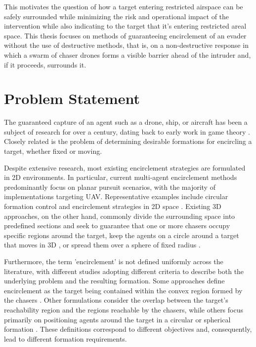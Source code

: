 This motivates the question of how a target entering restricted airspace can be safely surrounded while minimizing the risk and operational impact of the intervention while  also indicating to the target that it's entering restricted areal space. This thesis focuses on methods of guaranteeing encirclement of an evader without the use of destructive methods, that is, on a non-destructive response in which a swarm of chaser drones forms a visible barrier ahead of the intruder and, if it proceeds, surrounds it.

\section{Problem Statement} \label{sec.1:Problem Statement}

The guaranteed capture of an agent such as a drone, ship, or aircraft has been a subject of research for over a century, dating back to early work in game theory \cite{game_theory_1925}. Closely related is the problem of determining desirable formations for encircling a target, whether fixed or moving.

Despite extensive research, most existing encirclement strategies are formulated in \gls{2D} environments. In particular, current multi-agent encirclement methods predominantly focus on planar pursuit scenarios, with the majority of implementations targeting \gls{UAV}. Representative examples include circular formation control and encirclement strategies in \gls{2D} space \cite{Litimein2021, Jin2018, Kim2007, 2D_encirclement_guaranteed_sectors, Lin2004}. Existing \gls{3D} approaches, on the other hand, commonly divide the surrounding space into predefined sections and seek to guarantee that one or more chasers occupy specific regions around the target, keep the agents on a circle around a target that moves in \gls{3D} \cite{franchi2016}, or spread them over a sphere of fixed radius \cite{huang2025,bo2023}.

Furthermore, the term 'encirclement' is not defined uniformly across the literature, with different studies adopting different criteria to describe both the underlying problem and the resulting formation. Some approaches define encirclement as the target being contained within the convex region formed by the chasers \cite{mycielskiTheoriesPursuitEvasion1988,Wang_2021,Patra2025}. Other formulations consider the overlap between the target's reachability region and the regions reachable by the chasers, while others focus primarily on positioning agents around the target in a circular or spherical formation \cite{wangAchievingSafeMinimum2024,huang2025}. These definitions correspond to different objectives and, consequently, lead to different formation requirements.


